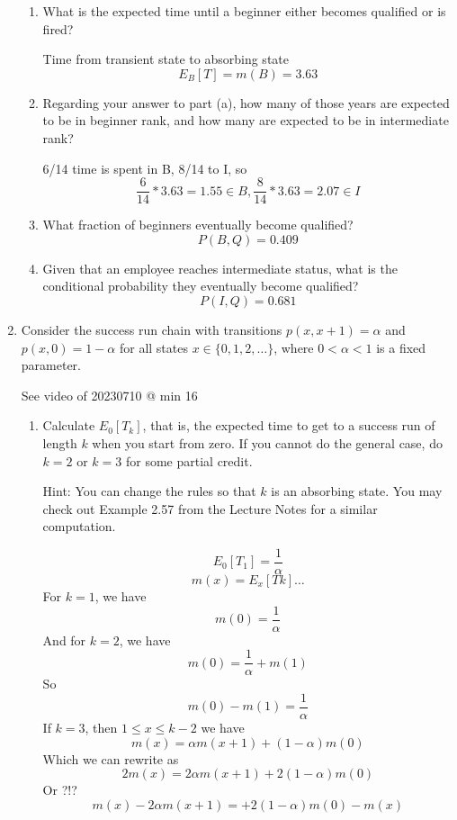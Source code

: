 \documentclass{article} %
\theoremstyle{plain}
\theoremstyle{case}
\begin{document}
\begin{enumerate}[label={\fbox{\textbf{Exercise \#\arabic* :}}}]
\begin{enumerate}
    \item What is the expected time until a beginner either becomes qualified or is fired? 

      Time from transient state to absorbing state
      \[ E_B[T] = m(B) = 3.63\]

    \item Regarding your answer to part (a), how many of those years are expected to be in beginner rank, and how many are expected to be in intermediate rank?

      6/14 time is spent in B, 8/14 to I, so
      \[ \frac{6}{14} * 3.63 = 1.55 \in B, \frac{8}{14}  * 3.63 = 2.07 \in  I \]

    \item  What fraction of beginners eventually become qualified?
      \[ P(B,Q) = 0.409 \]

    \item  Given that an employee reaches intermediate status, what is the conditional probability they eventually become qualified?
    \[ P(I,Q) = 0.681 \]
  \end{enumerate}

\newpage
  \item Consider the success run chain with transitions $p(x, x+1)=\alpha$ and $p(x, 0)=1-\alpha$ for all states $x \in\{0,1,2, \ldots\}$, where $0<\alpha<1$ is a fixed parameter.

    See video of 20230710 @ min 16

\begin{enumerate}
  \item  Calculate $E_{0}\left[T_{k}\right]$, that is, the expected time to get to a success run of length $k$ when you start from zero. If you cannot do the general case, do $k=2$ or $k=3$ for some partial credit.

Hint: You can change the rules so that $k$ is an absorbing state. You may check out Example 2.57 from the Lecture Notes for a similar computation.

    \[ E_0[T_1] = \frac{1}{\alpha}  \]
    \[ m(x) = E_x[Tk] \dots \]
    For $k=1$, we have
    \[ m(0) = \frac{1}{\alpha} \]
    And for $k=2$, we have
    \[ m(0) = \frac{1}{\alpha} + m(1) \]
    So
      \[ m(0) - m(1) = \frac{1}{\alpha}  \]
    If $k=3$, then $1 \leq x \leq k-2$ we have
    \[ m(x) = \alpha m(x+1) + (1- \alpha) m(0) \]
    Which we can rewrite as
    \[ 2m(x) = 2\alpha m(x+1) + 2(1- \alpha) m(0) \]
    Or ?!?
    \[ m(x) - 2 \alpha m(x+1) = + 2(1- \alpha) m(0) - m(x) \]


\end{enumerate}
\end{enumerate}
\end{document}
